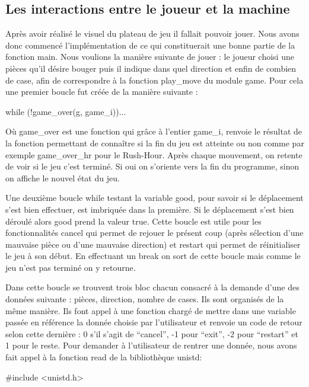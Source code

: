 \documentclass{report}
\begin{document}
\subsection{Les interactions entre le joueur et la machine}
Après avoir réalisé le visuel du plateau de jeu il fallait pouvoir jouer. Nous avons donc commencé l'implémentation de ce qui constituerait une bonne partie de la fonction main. Nous voulions la manière suivante de jouer : le joueur choisi une pièces qu'il désire bouger puis il indique dans quel direction et enfin de combien de case, afin de correspondre à la fonction play\_move du module game. Pour cela une premier boucle fut créée de la manière suivante :

\begin{verbatimtab}[10]
while (!game_over(g, game_i)){...}
\end{verbatimtab}

Où game\_over est une fonction qui grâce à l'entier game\_i, renvoie le résultat de la fonction permettant de connaître si la fin du jeu est atteinte ou non comme par exemple game\_over\_hr pour le Rush-Hour. Après chaque mouvement, on retente de voir si le jeu c'est terminé. Si oui on s'oriente vers la fin du programme, sinon on affiche le nouvel état du jeu.

Une deuxième boucle while testant la variable good, pour savoir si le déplacement s'est bien effectuer, est imbriquée dans la première. Si le déplacement s'est bien déroulé alors good prend la valeur true. Cette boucle est utile pour les fonctionnalités cancel qui permet de rejouer le présent coup (après sélection d'une mauvaise pièce ou d'une mauvaise direction) et restart qui permet de réinitialiser le jeu à son début. En effectuant un break on sort de cette boucle mais comme le jeu n'est pas terminé on y retourne.

Dans cette boucle se trouvent trois bloc chacun consacré à la demande d'une des données suivante : pièces, direction, nombre de cases. Ils sont organisés de la même manière. Ils font appel à une fonction chargé de mettre dans une variable passée en référence la donnée choisie par l'utilisateur et renvoie un code de retour selon cette dernière : 0 s'il s'agit de ``cancel'', -1 pour ``exit'', -2 pour ``restart'' et 1 pour le reste. Pour demander à l'utilisateur de rentrer une donnée, nous avons fait appel à la fonction read de la bibliothèque unistd:

\begin{verbatimtab}[10]
#include <unistd.h>
\end{verbatimtab}
\end{document}
